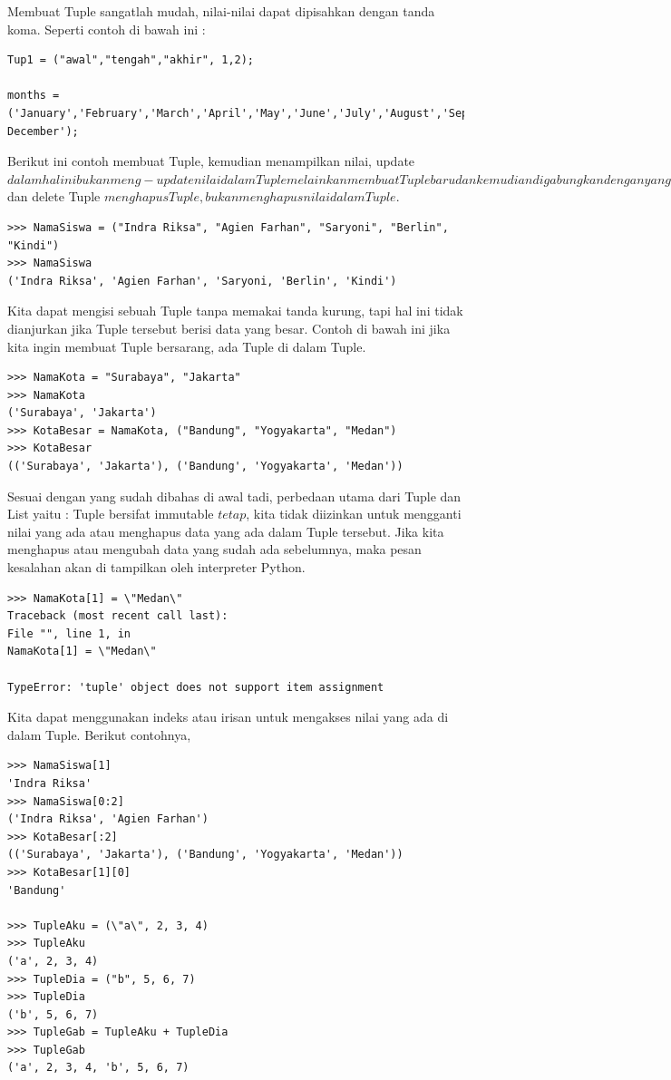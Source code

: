 Membuat Tuple sangatlah mudah, nilai-nilai dapat dipisahkan dengan tanda koma. Seperti contoh di bawah ini : 
\begin{verbatim}
Tup1 = ("awal","tengah","akhir", 1,2); 

months = ('January','February','March','April','May','June','July','August','September','October','November',' December'); 
 \end{verbatim}
Berikut ini contoh membuat Tuple, kemudian menampilkan nilai, update \(dalam hal ini bukan meng-update nilai dalam Tuple melainkan membuat Tuple baru dan kemudian digabungkan dengan yang lama\) dan delete Tuple \(menghapus Tuple, bukan menghapus nilai dalam Tuple\). 
\begin{verbatim}
>>> NamaSiswa = ("Indra Riksa", "Agien Farhan", "Saryoni", "Berlin", "Kindi") 
>>> NamaSiswa 
('Indra Riksa', 'Agien Farhan', 'Saryoni, 'Berlin', 'Kindi') 
\end{verbatim}
Kita dapat mengisi sebuah Tuple tanpa memakai tanda kurung, tapi hal ini tidak dianjurkan jika Tuple tersebut berisi data yang besar. Contoh di bawah ini jika kita ingin membuat Tuple bersarang, ada Tuple di dalam Tuple. 
\begin{verbatim}
>>> NamaKota = "Surabaya", "Jakarta" 
>>> NamaKota 
('Surabaya', 'Jakarta') 
>>> KotaBesar = NamaKota, ("Bandung", "Yogyakarta", "Medan") 
>>> KotaBesar 
(('Surabaya', 'Jakarta'), ('Bandung', 'Yogyakarta', 'Medan'))
\end{verbatim}
Sesuai dengan yang sudah dibahas di awal tadi, perbedaan utama dari Tuple dan List yaitu : 
Tuple bersifat immutable \(tetap\), kita tidak diizinkan untuk mengganti nilai yang ada atau menghapus data yang ada dalam Tuple tersebut. Jika kita menghapus atau mengubah data yang sudah ada sebelumnya, maka pesan kesalahan akan di tampilkan oleh interpreter Python. 
\begin{verbatim}
>>> NamaKota[1] = \"Medan\" 
Traceback (most recent call last): 
File "", line 1, in 
NamaKota[1] = \"Medan\" 

TypeError: 'tuple' object does not support item assignment 
\end{verbatim}
Kita dapat menggunakan indeks atau irisan untuk mengakses nilai yang ada di dalam Tuple. Berikut contohnya, 
\begin{verbatim}
>>> NamaSiswa[1] 
'Indra Riksa' 
>>> NamaSiswa[0:2] 
('Indra Riksa', 'Agien Farhan') 
>>> KotaBesar[:2] 
(('Surabaya', 'Jakarta'), ('Bandung', 'Yogyakarta', 'Medan')) 
>>> KotaBesar[1][0] 
'Bandung' 

>>> TupleAku = (\"a\", 2, 3, 4) 
>>> TupleAku 
('a', 2, 3, 4) 
>>> TupleDia = ("b", 5, 6, 7) 
>>> TupleDia 
('b', 5, 6, 7) 
>>> TupleGab = TupleAku + TupleDia 
>>> TupleGab 
('a', 2, 3, 4, 'b', 5, 6, 7) 
\end{verbatim}
